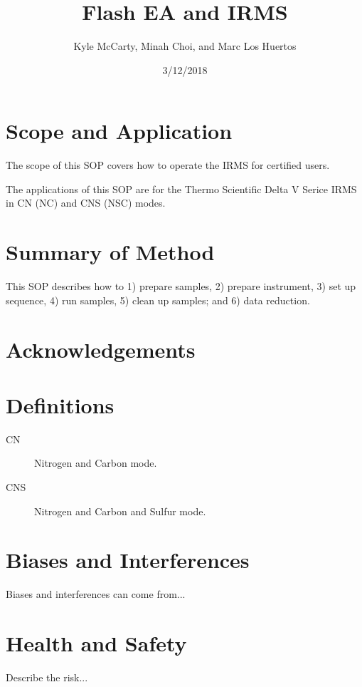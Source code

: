 \documentclass[12pt]{../SOP4_alpha}\usepackage[]{graphicx}\usepackage[]{color}
\title{Flash EA and IRMS}
\date{3/12/2018}
\author{Kyle McCarty, Minah Choi, and Marc Los Huertos}
\begin{document}
\maketitle

\section{Scope and Application}

\NP The scope of this SOP covers how to operate the IRMS for certified users.

\NP The applications of this SOP are for the Thermo Scientific Delta V Serice IRMS in CN (NC) and CNS (NSC) modes. 

\section{Summary of Method}

\NP This SOP describes how to 1) prepare samples, 2) prepare instrument, 3) set up sequence, 4) run samples, 5) clean up samples; and 6) data reduction. 

\tableofcontents

\newpage

\section{Acknowledgements}

\section{Definitions}

\begin{description}
	\item[CN] Nitrogen and Carbon mode.
  \item[CNS] Nitrogen and Carbon and Sulfur mode.
\end{description}

\section{Biases and Interferences}

\NP Biases and interferences can come from...

\section{Health and Safety}

\NP Describe the risk...
\end{document}
